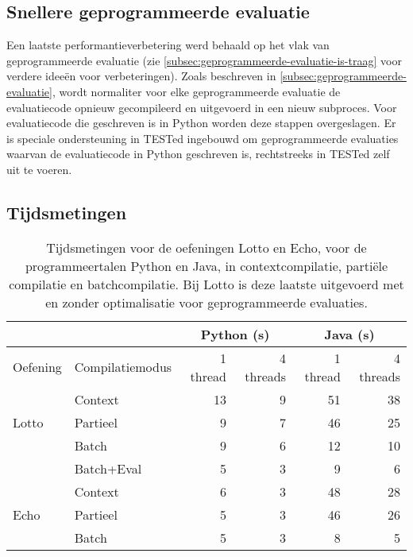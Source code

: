 \subsection{Snellere geprogrammeerde evaluatie}\label{subsec:snellere-geprogrammeerde-evaluatie}

Een laatste performantieverbetering werd behaald op het vlak van geprogrammeerde evaluatie (zie \cref{subsec:geprogrammeerde-evaluatie-is-traag} voor verdere ideeën voor verbeteringen).
Zoals beschreven in \cref{subsec:geprogrammeerde-evaluatie}, wordt normaliter voor elke geprogrammeerde evaluatie de evaluatiecode opnieuw gecompileerd en uitgevoerd in een nieuw subproces.
Voor evaluatiecode die geschreven is in Python worden deze stappen overgeslagen.
Er is speciale ondersteuning in TESTed ingebouwd om geprogrammeerde evaluaties waarvan de evaluatiecode in Python geschreven is, rechtstreeks in TESTed zelf uit te voeren.

\subsection{Tijdsmetingen}\label{subsec:tijdsmetingen}

\begin{table}
    \caption{Tijdsmetingen voor de oefeningen Lotto en Echo, voor de programmeertalen Python en Java, in contextcompilatie, partiële compilatie en batchcompilatie.
    Bij Lotto is deze laatste uitgevoerd met en zonder optimalisatie voor geprogrammeerde evaluaties.}
    \label{tab:meting}
    \centering
    \begin{tabular}{ll|r|r|r|r|}
        \cline{3-6}
        & & \multicolumn{2}{c|}{Python (s)} & \multicolumn{2}{c|}{Java (s)}  \\
        \hline
        \multicolumn{1}{|l|}{Oefening}               & Compilatiemodus  & 1 thread & 4 threads & 1 thread & 4 threads \\
        \hline
        \multicolumn{1}{|l|}{\multirow{3}{*}{Lotto}} & Context          & 13       & 9         & 51       & 38        \\
        \multicolumn{1}{|l|}{}                       & Partieel         & 9        & 7         & 46       & 25        \\
        \multicolumn{1}{|l|}{}                       & Batch            & 9        & 6         & 12       & 10        \\
        \multicolumn{1}{|l|}{}                       & Batch+Eval       & 5        & 3         & 9        & 6         \\
        \hline
        \multicolumn{1}{|l|}{\multirow{3}{*}{Echo}}  & Context           & 6        & 3         & 48       & 28        \\
        \multicolumn{1}{|l|}{}                       & Partieel          & 5        & 3         & 46       & 26        \\
        \multicolumn{1}{|l|}{}                       & Batch             & 5        & 3         & 8        & 5         \\
        \hline
    \end{tabular}
\end{table}

